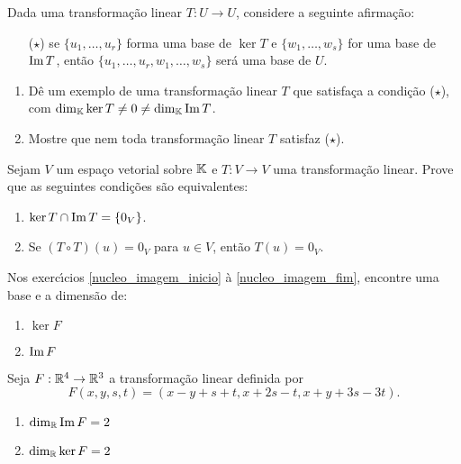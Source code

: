 \documentclass[12pt]{exam}
\begin{document}
\begin{exercicio}
	Dada uma transforma\c{c}\~ao linear $T : U \to U$, considere a seguinte afirma\c{c}\~ao:
	\begin{itemize}
		\item[($\star$)] se $\{u_1,\dots,u_r\}$ forma uma base de $\ker T$ e $\{w_1,\dots,w_s\}$ for uma base de ${\rm Im\,} T$, ent\~ao $\{u_1,\dots,u_r,w_1,\dots,w_s\}$ ser\'a uma base de $U$.
	\end{itemize}
	\begin{enumerate}[label=({\alph*})]
		\item D\^e um exemplo de uma transforma\c{c}\~ao linear $T$ que satisfa\c{c}a a condi\c{c}\~ao ($\star$), com $\dim_{\mathbb{K}}\ker T \ne 0 \ne \dim_{\mathbb{K}}{\rm Im\,} T$.
		\item Mostre que nem toda transforma\c{c}\~ao linear $T$ satisfaz ($\star$).
	\end{enumerate}
\end{exercicio}

\begin{exercicio}
	Sejam $V$ um espa\c{c}o vetorial sobre $\mathbb{K}$ e $T : V \to V$ uma transforma\c{c}\~ao linear. Prove que as seguintes condi\c{c}\~oes s\~ao equivalentes:
	\begin{enumerate}[label=({\alph*})]
		\item $\ker T \cap {\rm Im\,} T = \{0_V\}$.
		\item Se $(T\circ T)(u) = 0_V$ para $u \in V$, ent\~ao $T(u) = 0_V$.
	\end{enumerate}
\end{exercicio}

Nos exerc{\'\i}cios \eqref{nucleo_imagem_inicio} \`a \eqref{nucleo_imagem_fim}, encontre uma base e a dimens\~ao de:
\begin{enumerate}[label=({\alph*})]
	\item $\ker F$
	\item ${\rm Im\,} F$
\end{enumerate}

\begin{exercicio}\label{nucleo_imagem_inicio}
	Seja $F : \mathbb{R}^4 \to \mathbb{R}^3$ a transforma\c{c}\~ao linear definida por
	\[
	F(x,y,s,t) = (x - y + s + t, x + 2s - t, x + y + 3s - 3t).
	\]
	\begin{solucao}
		\begin{enumerate}[label=({\alph*})]
			\item $\dim_{\mathbb{R}}{\rm Im\,} F = 2$
			\item $\dim_{\mathbb{R}}\ker F = 2$
		\end{enumerate}
	\end{solucao}
\end{exercicio}
\end{document}
